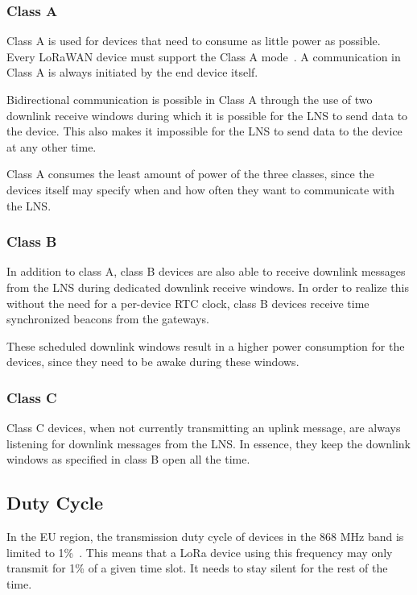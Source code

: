 \subsubsection{Class A}

Class A is used for devices that need to consume as little power as possible.
Every \ac{LoRaWAN} device must support the Class A mode~\cite[p. 11]{lora_alliance_inc_lorawan_2017}.
A communication in Class A is always initiated by the end device itself.

Bidirectional communication is possible in Class A through the use of two downlink receive windows during which it is possible for the \ac{LNS} to send data to the device.
This also makes it impossible for the \ac{LNS} to send data to the device at any other time.

Class A consumes the least amount of power of the three classes, since the devices itself may specify when and how often they want to communicate with the \ac{LNS}.

\subsubsection{Class B}

In addition to class A, class B devices are also able to receive downlink messages from the \ac{LNS} during dedicated downlink receive windows.
In order to realize this without the need for a per-device RTC clock, class B devices receive time synchronized beacons from the gateways.

These scheduled downlink windows result in a higher power consumption for the devices, since they need to be awake during these windows.

\subsubsection{Class C}

Class C devices, when not currently transmitting an uplink message, are always listening for downlink messages from the \ac{LNS}.
In essence, they keep the downlink windows as specified in class B open all the time.

\subsection{Duty Cycle}


In the \ac{EU} region, the transmission duty cycle of devices in the 868 MHz band is limited to 1\%~\cite{etsi_etsi_2012}.
This means that a \ac{LoRa} device using this frequency may only transmit for 1\% of a given time slot.
It needs to stay silent for the rest of the time.

